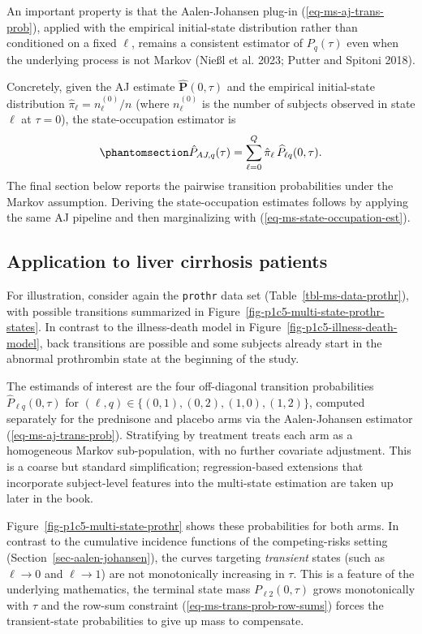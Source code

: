 \documentclass[
  letterpaper,
  krantz2]{style/krantz}
\begin{document}
An important property is that the Aalen-Johansen plug-in
(\ref{eq-ms-aj-trans-prob}), applied with the empirical initial-state
distribution rather than conditioned on a fixed \(\ell\), remains a
consistent estimator of \(P_q(\tau)\) even when the underlying process
is not Markov (Nießl et al. 2023; Putter and Spitoni 2018).

Concretely, given the AJ estimate \(\widehat{\mathbf{P}}(0, \tau)\) and
the empirical initial-state distribution
\(\hat{\pi}_\ell = n_\ell^{(0)}/n\) (where \(n_\ell^{(0)}\) is the
number of subjects observed in state \(\ell\) at \(\tau=0\)), the
state-occupation estimator is
\begin{equation}\phantomsection\label{eq-ms-state-occupation-est}{
\hat{P}_{AJ,q}(\tau) = \sum_{\ell=0}^{Q} \hat{\pi}_\ell\, \widehat{P}_{\ell q}(0, \tau).
}\end{equation} The final section below reports the pairwise transition
probabilities under the Markov assumption. Deriving the state-occupation
estimates follows by applying the same AJ pipeline and then
marginalizing with (\ref{eq-ms-state-occupation-est}).

\subsection{Application to liver cirrhosis
patients}\label{application-to-liver-cirrhosis-patients}

For illustration, consider again the \texttt{prothr} data set
(Table~\ref{tbl-ms-data-prothr}), with possible transitions summarized
in Figure~\ref{fig-p1c5-multi-state-prothr-states}. In contrast to the
illness-death model in Figure~\ref{fig-p1c5-illness-death-model}, back
transitions are possible and some subjects already start in the abnormal
prothrombin state at the beginning of the study.

The estimands of interest are the four off-diagonal transition
probabilities \(\hat{P}_{\ell q}(0, \tau)\) for
\((\ell, q) \in \{(0,1), (0,2), (1,0), (1,2)\}\), computed separately
for the prednisone and placebo arms via the Aalen-Johansen
estimator (\ref{eq-ms-aj-trans-prob}).
Stratifying by treatment treats each arm as a homogeneous Markov
sub-population, with no further covariate adjustment. This is a coarse
but standard simplification; regression-based extensions that
incorporate subject-level features into the multi-state estimation are
taken up later in the book.

Figure~\ref{fig-p1c5-multi-state-prothr} shows these probabilities for
both arms. In contrast to the cumulative incidence
functions of the competing-risks
setting (Section~\ref{sec-aalen-johansen}), the curves targeting
\emph{transient} states (such as
\(\ell \rightarrow 0\) and \(\ell \rightarrow 1\)) are not monotonically
increasing in \(\tau\). This is a feature of the underlying mathematics,
the terminal state mass \(P_{\ell 2}(0, \tau)\) grows monotonically with
\(\tau\) and the row-sum constraint (\ref{eq-ms-trans-prob-row-sums})
forces the transient-state probabilities to give up mass to compensate.
\end{document}
